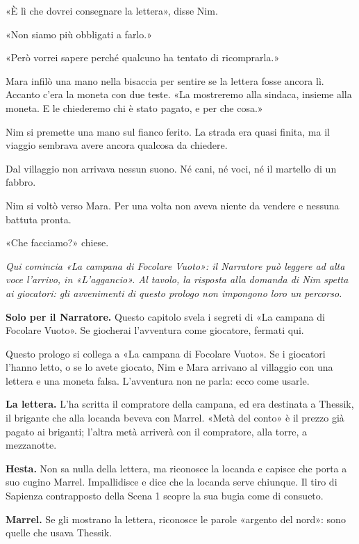 \documentclass[10pt,a4paper]{article}
\begin{document}
«È lì che dovrei consegnare la lettera», disse Nim.

«Non siamo più obbligati a farlo.»

«Però vorrei sapere perché qualcuno ha tentato di ricomprarla.»

Mara infilò una mano nella bisaccia per sentire se la lettera fosse ancora lì. Accanto c'era la moneta con due teste. «La mostreremo alla sindaca, insieme alla moneta. E le chiederemo chi è stato pagato, e per che cosa.»

Nim si premette una mano sul fianco ferito. La strada era quasi finita, ma il viaggio sembrava avere ancora qualcosa da chiedere.

Dal villaggio non arrivava nessun suono. Né cani, né voci, né il martello di un fabbro.

Nim si voltò verso Mara. Per una volta non aveva niente da vendere e nessuna battuta pronta.

«Che facciamo?» chiese.

\emph{Qui comincia «La campana di Focolare Vuoto»: il Narratore può leggere ad alta voce l'arrivo, in «L'aggancio». Al tavolo, la risposta alla domanda di Nim spetta ai giocatori: gli avvenimenti di questo prologo non impongono loro un percorso.}
\endgroup
\clearpage
{}
\begin{rpgnote}
\textbf{Solo per il Narratore.} Questo capitolo svela i segreti di «La campana di Focolare Vuoto». Se giocherai l'avventura come giocatore, fermati qui.
\end{rpgnote}
Questo prologo si collega a «La campana di Focolare Vuoto». Se i giocatori l'hanno letto, o se lo avete giocato, Nim e Mara arrivano al villaggio con una lettera e una moneta falsa. L'avventura non ne parla: ecco come usarle.

\textbf{La lettera.} L'ha scritta il compratore della campana, ed era destinata a Thessik, il brigante che alla locanda beveva con Marrel. «Metà del conto» è il prezzo già pagato ai briganti; l'altra metà arriverà con il compratore, alla torre, a mezzanotte.

\textbf{Hesta.} Non sa nulla della lettera, ma riconosce la locanda e capisce che porta a suo cugino Marrel. Impallidisce e dice che la locanda serve chiunque. Il tiro di Sapienza contrapposto della Scena 1 scopre la sua bugia come di consueto.

\textbf{Marrel.} Se gli mostrano la lettera, riconosce le parole «argento del nord»: sono quelle che usava Thessik.
\end{document}
